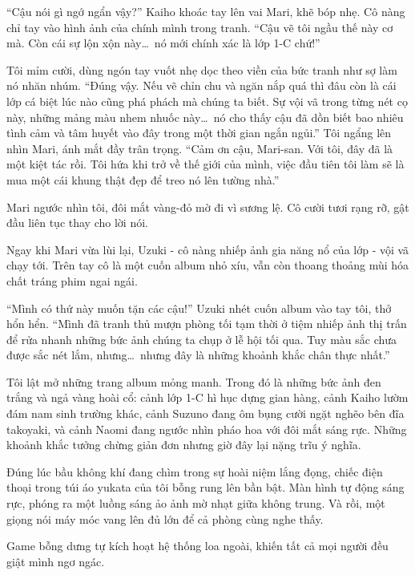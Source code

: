 \documentclass[../main.tex]{subfiles}
\begin{document}
``Cậu nói gì ngớ ngẩn vậy?'' Kaiho khoác tay lên vai Mari, khẽ bóp nhẹ. Cô nàng chỉ tay vào hình ảnh của chính mình trong tranh. ``Cậu vẽ tôi ngầu thế này cơ mà. Còn cái sự lộn xộn này\dots\ nó mới chính xác là lớp 1-C chứ!''

Tôi mỉm cười, dùng ngón tay vuốt nhẹ dọc theo viền của bức tranh như sợ làm nó nhăn nhúm. ``Đúng vậy. Nếu vẽ chỉn chu và ngăn nắp quá thì đâu còn là cái lớp cá biệt lúc nào cũng phá phách mà chúng ta biết. Sự vội vã trong từng nét cọ này, những mảng màu nhem nhuốc này\dots\ nó cho thấy cậu đã dồn biết bao nhiêu tình cảm và tâm huyết vào đây trong một thời gian ngắn ngủi.'' Tôi ngẩng lên nhìn Mari, ánh mắt đầy trân trọng. ``Cảm ơn cậu, Mari-san. Với tôi, đây đã là một kiệt tác rồi. Tôi hứa khi trở về thế giới của mình, việc đầu tiên tôi làm sẽ là mua một cái khung thật đẹp để treo nó lên tường nhà.''

Mari ngước nhìn tôi, đôi mắt vàng-đỏ mờ đi vì sương lệ. Cô cười tươi rạng rỡ, gật đầu liên tục thay cho lời nói.

Ngay khi Mari vừa lùi lại, Uzuki - cô nàng nhiếp ảnh gia năng nổ của lớp - vội vã chạy tới. Trên tay cô là một cuốn album nhỏ xíu, vẫn còn thoang thoảng mùi hóa chất tráng phim ngai ngái.

``Mình có thứ này muốn tặn các cậu!'' Uzuki nhét cuốn album vào tay tôi, thở hổn hển. ``Mình đã tranh thủ mượn phòng tối tạm thời ở tiệm nhiếp ảnh thị trấn để rửa nhanh những bức ảnh chúng ta chụp ở lễ hội tối qua. Tuy màu sắc chưa được sắc nét lắm, nhưng\dots\ nhưng đây là những khoảnh khắc chân thực nhất.''

Tôi lật mở những trang album mỏng manh. Trong đó là những bức ảnh đen trắng và ngả vàng hoài cổ: cảnh lớp 1-C hì hục dựng gian hàng, cảnh Kaiho lườm đám nam sinh trường khác, cảnh Suzuno đang ôm bụng cười ngặt nghẽo bên đĩa takoyaki, và cảnh Naomi đang ngước nhìn pháo hoa với đôi mắt sáng rực. Những khoảnh khắc tưởng chừng giản đơn nhưng giờ đây lại nặng trĩu ý nghĩa.

Đúng lúc bầu không khí đang chìm trong sự hoài niệm lắng đọng, chiếc điện thoại trong túi áo yukata của tôi bỗng rung lên bần bật. Màn hình tự động sáng rực, phóng ra một luồng sáng ảo ảnh mờ nhạt giữa không trung. Và rồi, một giọng nói máy móc vang lên đủ lớn để cả phòng cùng nghe thấy.


Game bỗng dưng tự kích hoạt hệ thống loa ngoài, khiến tất cả mọi người đều giật mình ngơ ngác.
\end{document}

